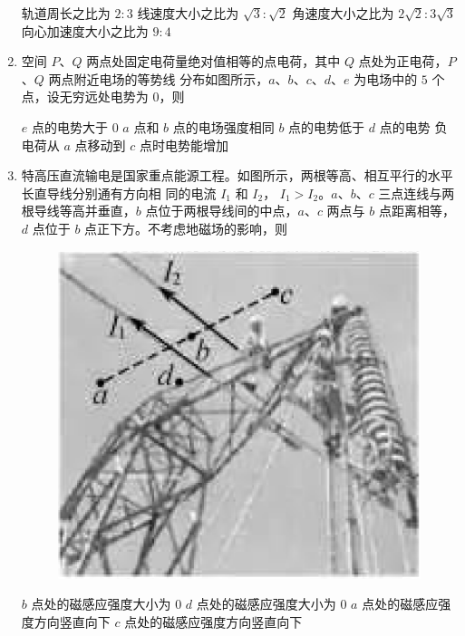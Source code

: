 \begin{enumerate}
\fourchoices
{轨道周长之比为 $ 2:3 $}
{线速度大小之比为 $ \sqrt{3} : \sqrt{2} $}
{角速度大小之比为 $2 \sqrt{2}: 3 \sqrt{3}$}
{向心加速度大小之比为 $ 9:4 $}




\item
空间 $ P $、$ Q $ 两点处固定电荷量绝对值相等的点电荷，其中 $ Q $ 点处为正电荷，$ P $、$ Q $ 两点附近电场的等势线
分布如图所示，$ a $、$ b $、$ c $、$ d $、$ e $ 为电场中的 $ 5 $ 个点，设无穷远处电势为 $ 0 $，则  
\begin{figure}[h!]
\centering

\end{figure}



\fourchoices
{$ e $ 点的电势大于 $ 0 $}
{$ a $ 点和 $ b $ 点的电场强度相同}
{$ b $ 点的电势低于 $ d $ 点的电势}
{负电荷从 $ a $ 点移动到 $ c $ 点时电势能增加}




\item
特高压直流输电是国家重点能源工程。如图所示，两根等高、相互平行的水平长直导线分别通有方向相
同的电流 $ I_{1} $ 和 $ I_{2} $， $ I_{1} > I_{2} $。$ a $、$ b $、$ c $ 三点连线与两根导线等高并垂直，$ b $ 点位于两根导线间的中点，$ a $、$ c $
两点与 $ b $ 点距离相等，$ d $ 点位于 $ b $ 点正下方。不考虑地磁场的影响，则  
\begin{figure}[h!]
\centering
\includegraphics[width=0.2\linewidth]{picture/screenshot046}
\end{figure}



\fourchoices
{$ b $ 点处的磁感应强度大小为 $ 0 $}
{$ d $ 点处的磁感应强度大小为 $ 0 $}
{$ a $ 点处的磁感应强度方向竖直向下}
{$ c $ 点处的磁感应强度方向竖直向下}




\end{enumerate}
